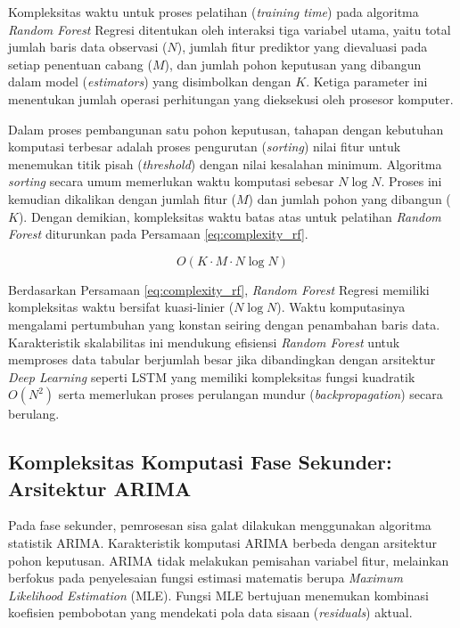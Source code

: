 Kompleksitas waktu untuk proses pelatihan (\textit{training time}) pada algoritma \textit{Random Forest} Regresi ditentukan oleh interaksi tiga variabel utama, yaitu total jumlah baris data observasi ($N$), jumlah fitur prediktor yang dievaluasi pada setiap penentuan cabang ($M$), dan jumlah pohon keputusan yang dibangun dalam model (\textit{estimators}) yang disimbolkan dengan $K$. Ketiga parameter ini menentukan jumlah operasi perhitungan yang dieksekusi oleh prosesor komputer.

Dalam proses pembangunan satu pohon keputusan, tahapan dengan kebutuhan komputasi terbesar adalah proses pengurutan (\textit{sorting}) nilai fitur untuk menemukan titik pisah (\textit{threshold}) dengan nilai kesalahan minimum. Algoritma \textit{sorting} secara umum memerlukan waktu komputasi sebesar $N \log N$. Proses ini kemudian dikalikan dengan jumlah fitur ($M$) dan jumlah pohon yang dibangun ($K$). Dengan demikian, kompleksitas waktu batas atas untuk pelatihan \textit{Random Forest} diturunkan pada Persamaan \ref{eq:complexity_rf}.

\begin{equation}
   O(K \cdot M \cdot N \log N)
\label{eq:complexity_rf}
\end{equation}

Berdasarkan Persamaan \ref{eq:complexity_rf}, \textit{Random Forest} Regresi memiliki kompleksitas waktu bersifat kuasi-linier ($N \log N$). Waktu komputasinya mengalami pertumbuhan yang konstan seiring dengan penambahan baris data. Karakteristik skalabilitas ini mendukung efisiensi \textit{Random Forest} untuk memproses data tabular berjumlah besar jika dibandingkan dengan arsitektur \textit{Deep Learning} seperti LSTM yang memiliki kompleksitas fungsi kuadratik $O(N^2)$ serta memerlukan proses perulangan mundur (\textit{backpropagation}) secara berulang.

\subsection{Kompleksitas Komputasi Fase Sekunder: Arsitektur ARIMA}

Pada fase sekunder, pemrosesan sisa galat dilakukan menggunakan algoritma statistik ARIMA. Karakteristik komputasi ARIMA berbeda dengan arsitektur pohon keputusan. ARIMA tidak melakukan pemisahan variabel fitur, melainkan berfokus pada penyelesaian fungsi estimasi matematis berupa \textit{Maximum Likelihood Estimation} (MLE). Fungsi MLE bertujuan menemukan kombinasi koefisien pembobotan yang mendekati pola data sisaan (\textit{residuals}) aktual.

